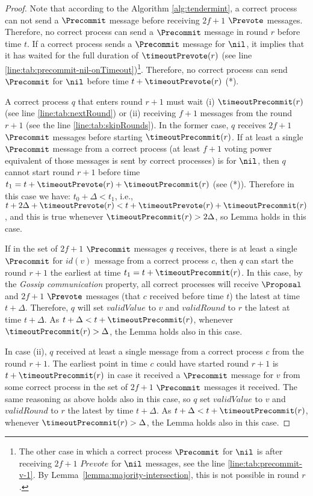 \begin{proof}
Note that according to the Algorithm \ref{alg:tendermint}, a correct process
can not send a $\Precommit$ message before receiving $2f+1$ $\Prevote$
messages.  Therefore, no correct process can send a $\Precommit$ message in
round $r$ before time $t$. If a correct process sends a $\Precommit$ message
for $\nil$, it implies that it has waited for the full duration of
$\timeoutPrevote(r)$ (see line
\ref{line:tab:precommit-nil-onTimeout})\footnote{The other case in which a
correct process $\Precommit$ for $\nil$ is after receiving $2f+1$ $Prevote$ for
$\nil$ messages, see the line \ref{line:tab:precommit-v-1}. By
Lemma~\ref{lemma:majority-intersection}, this is not possible in round $r$.}.
Therefore, no correct process can send $\Precommit$ for $\nil$ before time $t +
\timeoutPrevote(r)$ (*).

A correct process $q$ that enters round $r+1$ must wait (i) $\timeoutPrecommit(r)$
(see line \ref{line:tab:nextRound}) or (ii) receiving $f+1$ messages from the
round $r+1$ (see the line \ref{line:tab:skipRounds}).  In the former case, $q$
receives $2f+1$ $\Precommit$ messages before starting $\timeoutPrecommit(r)$. If
at least a single $\Precommit$ message from a correct process (at least $f+1$
voting power equivalent of those messages is sent by correct processes) is for
$\nil$, then $q$ cannot start round $r+1$ before time $t_1 = t +
\timeoutPrevote(r) + \timeoutPrecommit(r)$ (see (*)). Therefore in this case we have:
$t_0 + \Delta < t_1$, i.e., $t+2\Delta+\timeoutPrevote(r) <  t + \timeoutPrevote(r) +
\timeoutPrecommit(r)$, and this is true whenever $\timeoutPrecommit(r) > 2\Delta$, so
Lemma holds in this case. 

If in the set of $2f+1$ $\Precommit$ messages $q$ receives, there is at least a
single $\Precommit$ for $id(v)$ message from a correct process $c$, then $q$
can start the round $r+1$ the earliest at time $t_1 = t+\timeoutPrecommit(r)$. In
this case, by the \emph{Gossip communication} property, all correct processes
will receive $\Proposal$ and $2f+1$ $\Prevote$ messages (that $c$ received
before time $t$) the latest at time $t+\Delta$. Therefore, $q$ will set
$validValue$ to $v$ and $validRound$ to $r$ the latest at time $t+\Delta$. As
$t+\Delta < t+\timeoutPrecommit(r)$, whenever $\timeoutPrecommit(r) > \Delta$, the
Lemma holds also in this case.    

In case (ii), $q$ received at least a single message from a correct process $c$
from the round $r+1$. The earliest point in time $c$ could have started round
$r+1$ is $t+\timeoutPrecommit(r)$ in case it received a $\Precommit$ message for
$v$ from some correct process in the set of $2f+1$ $\Precommit$ messages it
received. The same reasoning as above holds also in this case, so $q$ set
$validValue$ to $v$ and $validRound$ to $r$ the latest by time $t+\Delta$. As
$t+\Delta < t+\timeoutPrecommit(r)$, whenever $\timeoutPrecommit(r) > \Delta$, the
Lemma holds also in this case.    \end{proof}

